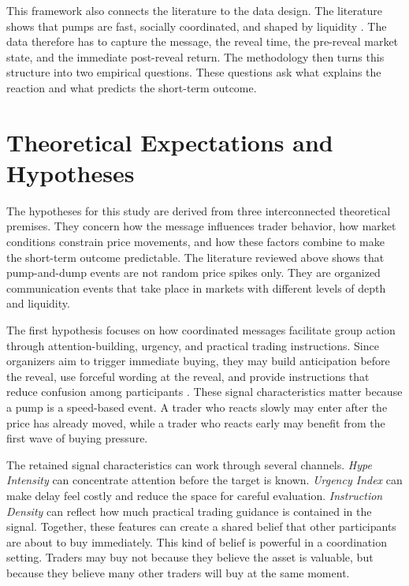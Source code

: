 This framework also connects the literature to the data design. The literature shows that pumps are fast, socially coordinated, and shaped by liquidity \cite{xu2019anatomy, li2021cryptocurrency, hamrick2021examination}. The data therefore has to capture the message, the reveal time, the pre-reveal market state, and the immediate post-reveal return. The methodology then turns this structure into two empirical questions. These questions ask what explains the reaction and what predicts the short-term outcome.

\section{Theoretical Expectations and Hypotheses}
\label{sec:theoretical-expectations-hypotheses}

The hypotheses for this study are derived from three interconnected theoretical premises. They concern how the message influences trader behavior, how market conditions constrain price movements, and how these factors combine to make the short-term outcome predictable. The literature reviewed above shows that pump-and-dump events are not random price spikes only. They are organized communication events that take place in markets with different levels of depth and liquidity.

The first hypothesis focuses on how coordinated messages facilitate group action through attention-building, urgency, and practical trading instructions. Since organizers aim to trigger immediate buying, they may build anticipation before the reveal, use forceful wording at the reveal, and provide instructions that reduce confusion among participants \cite{lamorgia2023doge, xu2019anatomy}. These signal characteristics matter because a pump is a speed-based event. A trader who reacts slowly may enter after the price has already moved, while a trader who reacts early may benefit from the first wave of buying pressure.

The retained signal characteristics can work through several channels. \textit{Hype Intensity} can concentrate attention before the target is known. \textit{Urgency Index} can make delay feel costly and reduce the space for careful evaluation. \textit{Instruction Density} can reflect how much practical trading guidance is contained in the signal. Together, these features can create a shared belief that other participants are about to buy immediately. This kind of belief is powerful in a coordination setting. Traders may buy not because they believe the asset is valuable, but because they believe many other traders will buy at the same moment.

